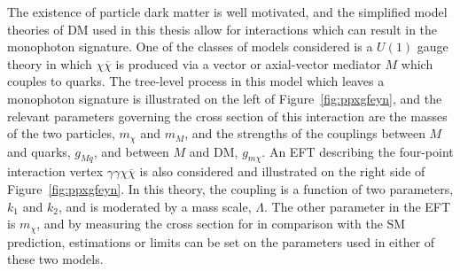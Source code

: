 The existence of particle dark matter
  is well motivated, and the simplified
  model theories of DM used in this thesis allow
  for interactions which can result in
  the monophoton signature.
 One of the classes of models considered is a $U(1)$
  gauge theory in which $\chi\overline{\chi}$
  is produced via a vector or axial-vector mediator $M$
  which couples to quarks. 
 The tree-level process in this model which leaves
  a  monophoton signature 
  is illustrated on the left of
  Figure~\ref{fig:ppxgfeyn}, and the
  relevant parameters governing
  the cross section of this interaction are
  the masses of the two particles, $m_\chi$
  and $m_M$, and the strengths of the couplings
  between $M$ and quarks, $g_{Mq}$,
  and between $M$ and DM, $g_{m\chi}$.
 An EFT describing the four-point interaction
  vertex $\gamma\gamma\chi\overline{\chi}$ is also
  considered and illustrated on the right side of
  Figure~\ref{fig:ppxgfeyn}.
 In this theory, the coupling is a function
  of two parameters, $k_1$ and $k_2$,
  and is moderated by a mass scale, $\Lambda$.
 The other parameter in the EFT is $m_\chi$,
  and by measuring the cross section for
  \pploneg in comparison with the SM prediction,
  estimations or limits can be set on 
  the parameters used in either of these
  two models.
  
